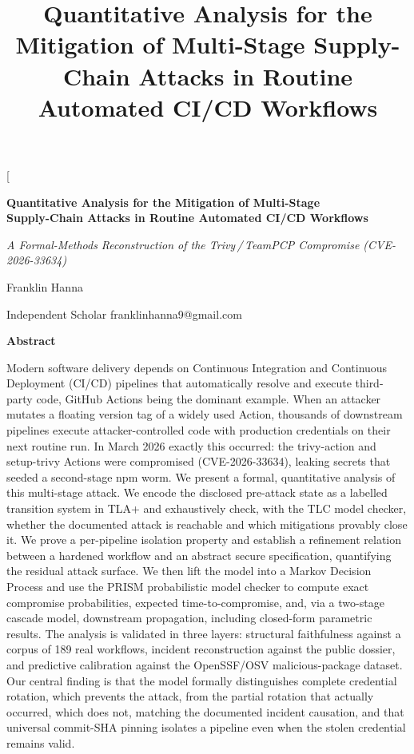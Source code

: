 \documentclass[letterpaper,twocolumn,10pt]{article}
\title{Quantitative Analysis for the Mitigation of Multi-Stage Supply-Chain Attacks in Routine Automated CI/CD Workflows}
\author{}
\date{}
\begin{document}
\twocolumn[{%
  \centering
  {\LARGE\bfseries Quantitative Analysis for the Mitigation of Multi-Stage\\[2pt]
   Supply-Chain Attacks in Routine Automated CI/CD Workflows\par}
  \vspace{0.6em}
  {\large\itshape A Formal-Methods Reconstruction of the Trivy\,/\,TeamPCP Compromise (CVE-2026-33634)\par}
  \vspace{1.0em}
  {\large Franklin Hanna\par}\vspace{0.2em}
  {\normalsize Independent Scholar \quad franklinhanna9@gmail.com\par}
  \vspace{1.4em}
  \begin{minipage}{0.86\textwidth}
    \begin{center}\textbf{Abstract}\end{center}\vspace{0.3em}
    \noindent Modern software delivery depends on Continuous Integration and Continuous Deployment (CI/CD) pipelines that automatically resolve and execute third-party code, GitHub Actions being the dominant example. When an attacker mutates a floating version tag of a widely used Action, thousands of downstream pipelines execute attacker-controlled code with production credentials on their next routine run. In March 2026 exactly this occurred: the trivy-action and setup-trivy Actions were compromised (CVE-2026-33634), leaking secrets that seeded a second-stage npm worm. We present a formal, quantitative analysis of this multi-stage attack. We encode the disclosed pre-attack state as a labelled transition system in TLA+ and exhaustively check, with the TLC model checker, whether the documented attack is reachable and which mitigations provably close it. We prove a per-pipeline isolation property and establish a refinement relation between a hardened workflow and an abstract secure specification, quantifying the residual attack surface. We then lift the model into a Markov Decision Process and use the PRISM probabilistic model checker to compute exact compromise probabilities, expected time-to-compromise, and, via a two-stage cascade model, downstream propagation, including closed-form parametric results. The analysis is validated in three layers: structural faithfulness against a corpus of 189 real workflows, incident reconstruction against the public dossier, and predictive calibration against the OpenSSF/OSV malicious-package dataset. Our central finding is that the model formally distinguishes complete credential rotation, which prevents the attack, from the partial rotation that actually occurred, which does not, matching the documented incident causation, and that universal commit-SHA pinning isolates a pipeline even when the stolen credential remains valid.
    \vspace{0.6em}


\end{minipage}}
\end{document}
